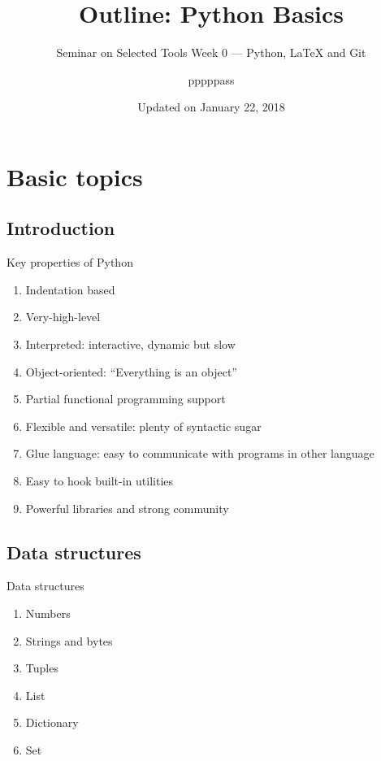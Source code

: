 \documentclass[english, nochinese]{../TeXTemplate/pkuslide}
\title{Outline: Python Basics}
\subtitle{Seminar on Selected Tools Week 0 --- Python, \texorpdfstring{\LaTeX}{LaTeX} and Git}
\author{pppppass}
\date{Updated on January 22, 2018}
\begin{document}
\begin{frame}
\titlepage
\end{frame}

\begin{frame}
\tableofcontents[subsectionstyle=show]
\end{frame}

\section{Basic topics}

\begin{frame}
\sectionpage
\end{frame}

\subsection{Introduction}

\begin{frame}{Key properties of Python}
\begin{enumerate}
\item Indentation based
\item Very-high-level
\item Interpreted: interactive, dynamic but slow
\item Object-oriented: ``Everything is an object''
\item Partial functional programming support
\item Flexible and versatile: plenty of syntactic sugar
\item Glue language: easy to communicate with programs in other language
\item Easy to hook built-in utilities
\item Powerful libraries and strong community
\end{enumerate}
\end{frame}

\subsection{Data structures}

\begin{frame}{Data structures}
\begin{enumerate}
\item Numbers
\item Strings and bytes
\item Tuples
\item List
\item Dictionary
\item Set
\end{enumerate}
\end{frame}
\end{document}
